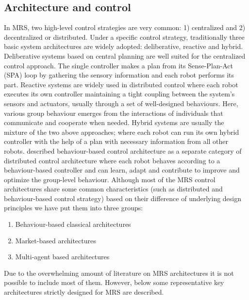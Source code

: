 \subsection{Architecture and control}
\label{bg:mrs:arch}
In MRS, two high-level control strategies are very common: 1) centralized and 2) decentralized or distributed. Under a specific control strategy, traditionally three basic system architectures are widely adopted: deliberative, reactive and hybrid. Deliberative systems based on central planning are well suited for the centralized control approach. The single controller makes a plan from its Sense-Plan-Act (SPA) loop by gathering the sensory information and each robot performs its part. Reactive systems are widely used in distributed control where each robot executes its own controller maintaining a tight coupling between the system's sensors and actuators, usually through a set of well-designed behaviours. Here, various group behaviour emerges from the interactions of individuals that communicate and cooperate when needed. Hybrid systems are usually the mixture of the two above approaches; where each robot can run its own hybrid controller with the help of a plan with necessary information from all other robots. \cite{Mataric2007} described behaviour-based control architecture as a separate category of distributed control architecture where each robot behaves according to a behaviour-based controller and can learn, adapt and contribute to improve and optimize the group-level behaviour. 
Although most of the MRS control architectures share some common characteristics (such as distributed and behaviour-based control strategy) based on their difference of underlying design principles we have put them into three groups:
\begin{enumerate}
\item Behaviour-based classical architectures
\item Market-based architectures
\item Multi-agent based architectures
\end{enumerate}
Due to the overwhelming amount of literature on MRS architectures it is not possible to include most of them. However, below some representative key architectures strictly designed for MRS are described. 
